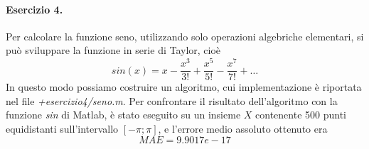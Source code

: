 \paragraph{Esercizio 4.} Per calcolare la funzione seno, utilizzando solo operazioni algebriche elementari, si può sviluppare la funzione in serie di Taylor, cioè
\[
sin(x) = x - \frac{x^3}{3!} + \frac{x^5}{5!} - \frac{x^7}{7!} + \ldots
\]
In questo modo possiamo costruire un algoritmo, cui implementazione è riportata nel file \emph{+esercizio4/seno.m}. Per confrontare il risultato dell'algoritmo con la funzione \emph{sin} di Matlab, è stato eseguito su un insieme $X$ contenente 500 punti equidistanti sull'intervallo $[-\pi; \pi]$, e l'errore medio assoluto ottenuto era
\[
MAE = 9.9017e-17
\]